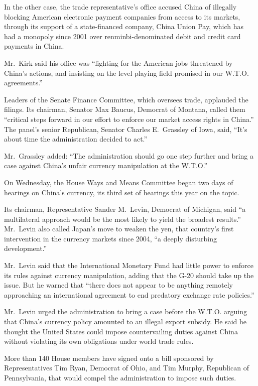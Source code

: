 ﻿\documentclass[12pt]{article}
\begin{document}
In the other case, the trade representative's office accused China of illegally blocking American
electronic payment companies from access to its markets, through its support of a state-financed
company, China Union Pay, which has had a monopoly since 2001 over renminbi-denominated debit and
credit card payments in China.

Mr.~Kirk said his office was ``fighting for the American jobs threatened by China's actions, and
insisting on the level playing field promised in our W.T.O. agreements.''

Leaders of the Senate Finance Committee, which oversees trade, applauded the filings. Its chairman,
Senator Max Baucus, Democrat of Montana, called them ``critical steps forward in our effort to
enforce our market access rights in China.'' The panel's senior Republican, Senator Charles
E.~Grassley of Iowa, said, ``It's about time the administration decided to act.''

Mr.~Grassley added: ``The administration should go one step further and bring a case against China's
unfair currency manipulation at the W.T.O.''

On Wednesday, the House Ways and Means Committee began two days of hearings on China's currency, its
third set of hearings this year on the topic.

Its chairman, Representative Sander M.~Levin, Democrat of Michigan, said ``a multilateral approach
would be the most likely to yield the broadest results.'' Mr.~Levin also called Japan's move to
weaken the yen, that country's first intervention in the currency markets since 2004, ``a deeply
disturbing development.''

Mr.~Levin said that the International Monetary Fund had little power to enforce its rules against
currency manipulation, adding that the G-20 should take up the issue. But he warned that ``there
does not appear to be anything remotely approaching an international agreement to end predatory
exchange rate policies.''

Mr.~Levin urged the administration to bring a case before the W.T.O. arguing that China's currency
policy amounted to an illegal export subsidy. He said he thought the United States could impose
countervailing duties against China without violating its own obligations under world trade rules.

More than 140 House members have signed onto a bill sponsored by Representatives Tim Ryan, Democrat
of Ohio, and Tim Murphy, Republican of Pennsylvania, that would compel the administration to impose
such duties.
\end{document}
